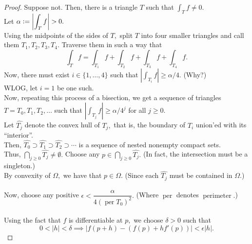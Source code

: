 \goursat*\label{thm:goursat2}
\begin{flushright}\hyperref[thm:goursat]{\upsym}\end{flushright}
\begin{proof}
	Suppose not. Then, there is a triangle $T$ such that $\displaystyle\int_T f \neq 0.$\\
	Let $\alpha \vcentcolon= \left|\displaystyle\int_T f\right| > 0.$\\
	Using the midpoints of the sides of $T,$ split $T$ into four smaller triangles and call them $T_1, T_2, T_3, T_4.$ Traverse them in such a way that
	\begin{equation*} 
		\int_Tf = \int_{T_1}f + \int_{T_2}f + \int_{T_3}f + \int_{T_4}f. 
	\end{equation*}
	Now, there must exist $i \in \{1, \ldots, 4\}$ such that $\left|\displaystyle\int_{T_i}f\right| \ge \alpha/4.$ (Why?)\\
	WLOG, let $i = 1$ be one such.\\
	Now, repeating this process of a bisection, we get a sequence of triangles $T = T_0, T_1, T_2, \ldots$ such that $\left|\displaystyle\int_{T_j}f\right| \ge \alpha/4^j$ for all $j \ge 0.$\\
	Let $\widehat{T_j}$ denote the convex hull of $T_j,$ that is, the boundary of $T_i$ union'ed with its ``interior''.\\
	Then, $\widehat{T_0} \supset \widehat{T_1} \supset \widehat{T_2}  \supset \cdots$ is a sequence of nested nonempty compact sets.\\
	Thus, $\displaystyle\bigcap_{j\ge 0}\widehat{T_j} \neq \emptyset.$
	Choose any $p \in \displaystyle\bigcap_{j\ge 0}\widehat{T_j}.$ (In fact, the intersection must be a singleton.) \\
	By convexity of $\Omega,$ we have that $p \in \Omega.$ (Since each $\widehat{T_j}$ must be contained in $\Omega$.)\\~\\
	Now, choose any positive $\epsilon < \dfrac{\alpha}{4(\operatorname{per} T_0)^2}.$ (Where $\operatorname{per}$ denotes $\operatorname{perimeter}.$)\\~\\
	Using the fact that $f$ is differentiable at $p,$ we choose $\delta > 0$ such that 
	\begin{equation*} 	
		0 < |h| < \delta \implies \left|f(p + h) - (f(p) + hf'(p))\right| < \epsilon|h|.
	\end{equation*}


\end{proof}
